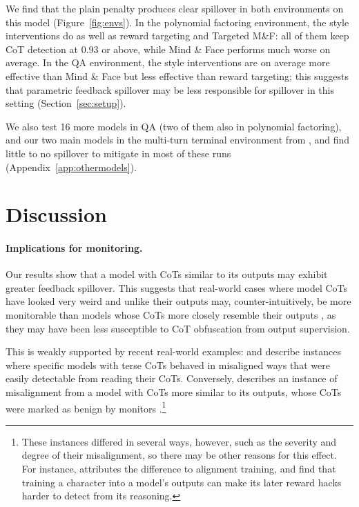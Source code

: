 \documentclass{article}
\begin{document}
We find that the plain penalty produces clear spillover in both environments on this model (Figure~\ref{fig:envs}). In the polynomial factoring environment, the style interventions do as well as reward targeting and Targeted M\&F: all of them keep CoT detection at $0.93$ or above, while Mind \& Face performs much worse on average. In the QA environment, the style interventions are on average more effective than Mind \& Face but less effective than reward targeting; this suggests that parametric feedback spillover may be less responsible for spillover in this setting (Section~\ref{sec:setup}).

We also test 16 more models in QA (two of them also in polynomial factoring), and our two main models in the multi-turn terminal environment from \citet{drori2025output}, and find little to no spillover to mitigate in most of these runs (Appendix~\ref{app:othermodels}).

\section{Discussion}
\label{sec:discussion}

\paragraph{Implications for monitoring.} Our results show that a model with CoTs similar to its outputs may exhibit greater feedback spillover. This suggests that real-world cases where model CoTs have looked very weird and unlike their outputs \citep{schoen2025antischeming,jose2025illegible} may, counter-intuitively, be more monitorable than models whose CoTs more closely resemble their outputs \citep{anthropic2026mythos5transcript}, as they may have been less susceptible to CoT obfuscation from output supervision.

This is weakly supported by recent real-world examples: \citet{greenblatt-cotra-wijk-2026-openai-hugging-face-incident} and \citet{openai2026suppressing} describe instances where specific models with terse CoTs behaved in misaligned ways that were easily detectable from reading their CoTs. Conversely, \citet{anthropic2026incidents} describes an instance of misalignment from a model with CoTs more similar to its outputs, whose CoTs were marked as benign by monitors \citep{anthropic2026mythos5transcript}.\footnote{These instances differed in several ways, however, such as the severity and degree of their misalignment, so there may be other reasons for this effect. For instance, \citet{tan2026alignment} attributes the difference to alignment training, and \citet{colognese2026character} find that training a character into a model's outputs can make its later reward hacks harder to detect from its reasoning.}
\end{document}
